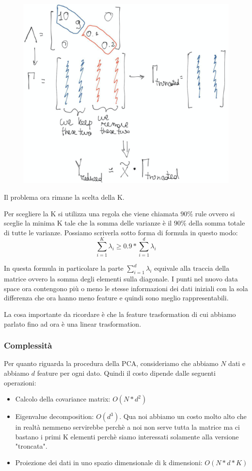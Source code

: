 \documentclass[14pt]{extreport}
\begin{document}
\begin{figure}[H] 
\centering
\includegraphics[width=0.7\linewidth]{450.jpeg}
\end{figure}

Il problema ora rimane la scelta della K.

Per scegliere la K si utilizza una regola che viene chiamata $90\%$ rule ovvero si sceglie la minima K tale che 
la somma delle varianze è il $90\%$ della somma totale di tutte le varianze.
Possiamo scriverla sotto forma di formula in questo modo:
$$\sum_{i=1}^K \lambda_i \geq 0.9 * \sum_{i=1}^d \lambda_i$$

In questa formula in particolare la parte $\sum_{i=1}^d \lambda_i$ equivale alla traccia della matrice ovvero la somma degli elementi
sulla diagonale.
I punti nel nuovo data space ora contengono più o meno le stesse informazioni dei dati iniziali con la sola differenza che ora hanno 
meno feature e quindi sono meglio rappresentabili.

La cosa importante da ricordare è che la feature trasformation di cui abbiamo parlato fino ad ora è una linear trasformation.

\subsubsection{Complessità}

Per quanto riguarda la procedura della PCA, consideriamo che abbiamo $N$ dati e abbiamo $d$ feature per ogni dato. 
Quindi il costo dipende dalle seguenti operazioni:

\begin{itemize}
\item Calcolo della covariance matrix: $O(N*d^2)$
\item Eigenvalue decomposition: $O(d^3)$. Qua noi abbiamo un costo molto alto che in realtà nemmeno servirebbe perchè a noi
non serve tutta la matrice ma ci bastano i primi K elementi perchè siamo interessati solamente alla versione "troncata".
\item Proiezione dei dati in uno spazio dimensionale di k dimensioni: $O(N*d*K)$
\end{itemize}
\end{document}
